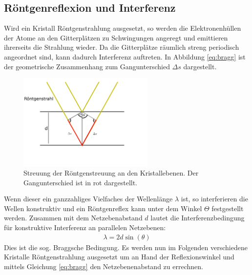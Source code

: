 \subsection{Röntgenreflexion und Interferenz}
Wird ein Kristall Röntgenstrahlung ausgesetzt, so werden die Elektronenhüllen der Atome an den Gitterplätzen zu Schwingungen angeregt und emittieren ihrerseits die Strahlung wieder. Da die Gitterplätze räumlich streng periodisch angeordnet sind, kann dadurch Interferenz auftreten. In Abbildung \ref{eq:bragg} ist der geometrische Zusammenhang zum Gangunterschied $\Delta s$ dargestellt.
\begin{figure}[htbp]
	\includegraphics[width=0.6\textwidth]{../pics/bragg.png}
	\caption{Streuung der Röntgenstreuung an den Kristallebenen. Der Gangunterschied ist in rot dargestellt.}
	\label{pic:bragg}
\end{figure}
Wenn dieser ein ganzzahliges Vielfaches der Wellenlänge $\lambda$ ist, so interferieren die Wellen konstruktiv und ein Röntgenreflex kann unter dem Winkel $\Theta$ festgestellt werden. Zusammen mit dem Netzebenabstand $d$ lautet die Interferenzbedingung für konstruktive Interferenz an parallelen Netzebenen:
\begin{align}
 \lambda = 2 d \sin(\theta)
 \label{eq:bragg}
\end{align}
Dies ist die sog. Braggsche Bedingung. Es werden nun im Folgenden verschiedene Kristalle Röntgenstrahlung ausgesetzt um an Hand der Reflexionswinkel und mittels Gleichung \ref{eq:bragg} den Netzebenenabstand zu errechnen.

